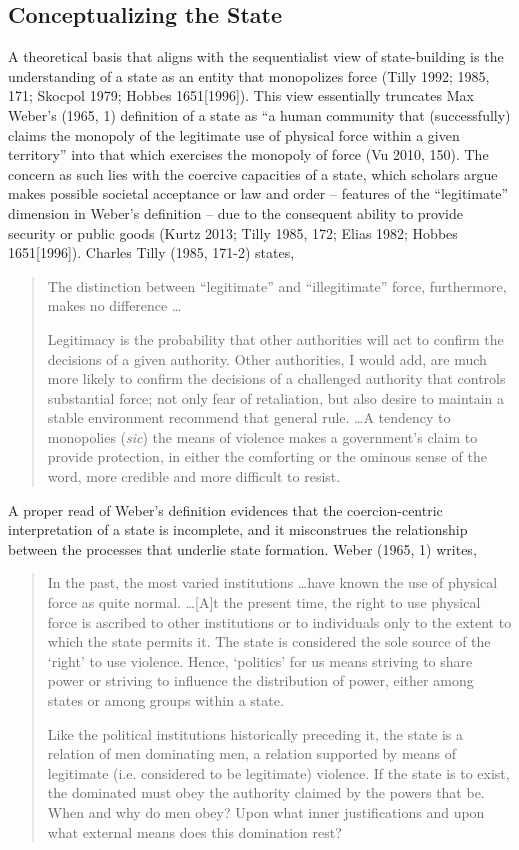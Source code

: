 \documentclass [11pt]{article}
\begin{document}
\subsection*{Conceptualizing the State}

A theoretical basis that aligns with the sequentialist view of state-building is the understanding of a state as an entity that monopolizes force (Tilly 1992; 1985, 171; Skocpol 1979; Hobbes 1651[1996]). This view essentially truncates Max Weber's (1965, 1) definition of a state as “a human community that (successfully) claims the monopoly of the legitimate use of physical force within a given territory” into that which exercises the monopoly of force (Vu 2010, 150). The concern as such lies with the coercive capacities of a state, which scholars argue makes possible societal acceptance or law and order -- features of the ``legitimate'' dimension in Weber's definition -- due to the consequent ability to provide security or public goods (Kurtz 2013; Tilly 1985, 172; Elias 1982; Hobbes 1651[1996]). Charles Tilly (1985, 171-2) states,

\begin{quote}
\small
The distinction between ``legitimate'' and ``illegitimate'' force, furthermore, makes no difference \dots

Legitimacy is the probability that other authorities will act to confirm the decisions of a given authority. Other authorities, I would add, are much more likely to confirm the decisions of a challenged authority that controls substantial force; not only fear of retaliation, but also desire to maintain a stable environment recommend that general rule. \dots A tendency to monopolies (\emph{sic}) the means of violence makes a government's claim to provide protection, in either the comforting or the ominous sense of the word, more credible and more difficult to resist.
\end{quote}

A proper read of Weber's definition evidences that the coercion-centric interpretation of a state is incomplete, and it misconstrues the relationship between the processes that underlie state formation. Weber (1965, 1) writes,

\begin{quote}
\small
In the past, the most varied institutions \dots have known the use of physical force as quite normal. \dots [A]t the present time, the right to use physical force is ascribed to other institutions or to individuals only to the extent to which the state permits it. The state is considered the sole source of the `right' to use violence. Hence, `politics' for us means striving to share power or striving to influence the distribution of power, either among states or among groups within a state.

Like the political institutions historically preceding it, the state is a relation of men dominating men, a relation supported by means of legitimate (i.e. considered to be legitimate) violence. If the state is to exist, the dominated must obey the authority claimed by the powers that be. When and why do men obey? Upon what inner justifications and upon what external means does this domination rest?
\end{quote}
\end{document}

